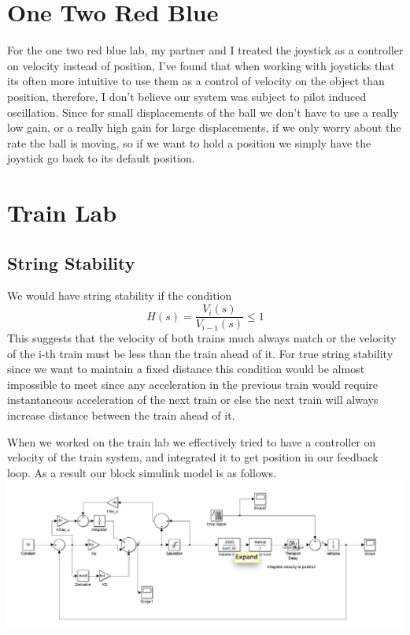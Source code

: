 \documentclass[english]{article}
\begin{document}
\section*{One Two Red Blue}
For the one two red blue lab, my partner and I treated the joystick as a controller on velocity instead of position, I've found that when working with joysticks that its often more intuitive to use them as a control of velocity on the object than position, therefore, I don't believe our system was subject to pilot induced oscillation. Since for small displacements of the ball we don't have to use a really low gain, or a really high gain for large displacements, if we only worry about the rate the ball is moving, so if we want to hold a position we simply have the joystick go back to its default position. 

\section*{Train Lab}
\subsection*{String Stability}
We would have string stability if the condition 
$$ H(s) = \frac{V_i(s)}{V_{i-1}(s)}  \leq 1 
$$ 
This suggests that the velocity of both trains much always match or the  velocity of the i-th train must be less than the train ahead of it. For true string stability since we want to maintain a fixed distance this condition would be almost impossible to meet since any acceleration in the previous train would require instantaneous acceleration of the next train or else the next train will always increase distance between the train ahead of it. 

When we worked on the train lab we effectively tried to have a controller on velocity of the train system, and integrated it to get position in our feedback loop. As a result our block simulink model is as follows.
\includegraphics[width = \linewidth]{simlink.png}
\FloatBarrier
\end{document}
